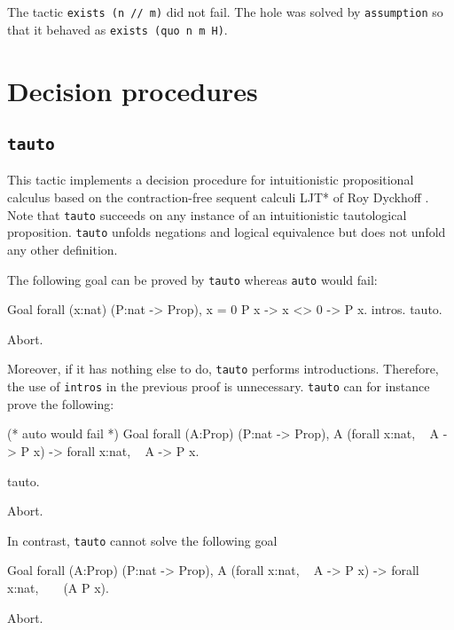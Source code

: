 \begin{coq_example*}
The tactic {\tt exists (n // m)} did not fail. The hole was solved by
{\tt assumption} so that it behaved as {\tt exists (quo n m H)}.

\section{Decision procedures}

\subsection{\tt tauto}
\label{tauto}

This tactic implements a decision procedure for intuitionistic propositional
calculus based on the contraction-free sequent calculi LJT* of Roy Dyckhoff
\cite{Dyc92}. Note that {\tt tauto} succeeds on any instance of an
intuitionistic tautological proposition. {\tt tauto} unfolds negations
and logical equivalence but does not unfold any other definition.

The following goal can be proved by {\tt tauto} whereas {\tt auto}
would fail:

\begin{coq_example}
Goal forall (x:nat) (P:nat -> Prop), x = 0 \/ P x -> x <> 0 -> P x.
  intros.
  tauto.
\end{coq_example}
\begin{coq_eval}
Abort.
\end{coq_eval}

Moreover, if it has nothing else to do, {\tt tauto} performs
introductions. Therefore, the use of {\tt intros} in the previous
proof is unnecessary. {\tt tauto} can for instance prove the
following:
\begin{coq_example}
(* auto would fail *)
Goal forall (A:Prop) (P:nat -> Prop),
    A \/ (forall x:nat, ~ A -> P x) -> forall x:nat, ~ A -> P x.

  tauto.
\end{coq_example}
\begin{coq_eval}
Abort.
\end{coq_eval}

\Rem In contrast, {\tt tauto} cannot solve the following goal

\begin{coq_example*}
Goal forall (A:Prop) (P:nat -> Prop),
    A \/ (forall x:nat, ~ A -> P x) -> forall x:nat, ~ ~ (A \/ P x).
\end{coq_example*}
\begin{coq_eval}
Abort.
\end{coq_eval}


\end{coq_example*}
